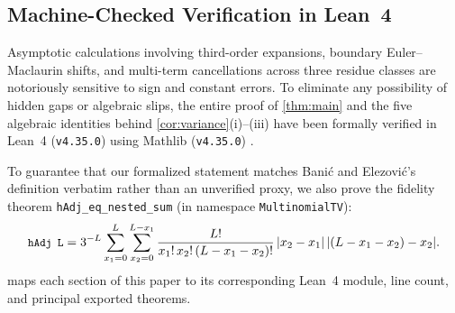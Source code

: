 \documentclass[11pt,a4paper]{article}
\numberwithin{equation}{section}
\theoremstyle{plain}
\theoremstyle{definition}
\theoremstyle{remark}
\newcommand{\code}[1]{\texttt{\small #1}}
\begin{document}
\subsection{Machine-Checked Verification in Lean~4}

Asymptotic calculations involving third-order expansions, boundary Euler--Maclaurin shifts, and multi-term cancellations across three residue classes are notoriously sensitive to sign and constant errors. To eliminate any possibility of hidden gaps or algebraic slips, the entire proof of \cref{thm:main} and the five algebraic identities behind \cref{cor:variance}(i)--(iii) have been formally verified in Lean~4 (\code{v4.35.0}) \cite{moura_ullrich2021} using Mathlib (\code{v4.35.0}) \cite{mathlib2020}.

To guarantee that our formalized statement matches Bani\'c and Elezovi\'c's definition verbatim rather than an unverified proxy, we also prove the fidelity theorem \code{hAdj\_eq\_nested\_sum} (in namespace \code{MultinomialTV}):
\[
  \code{hAdj L} = 3^{-L} \sum_{x_1=0}^{L}\sum_{x_2=0}^{L-x_1}
  \frac{L!}{x_1!\,x_2!\,(L-x_1-x_2)!}\,|x_2-x_1|\,|(L-x_1-x_2)-x_2|.
\]
 maps each section of this paper to its corresponding Lean~4 module, line count, and principal exported theorems.
\end{document}
